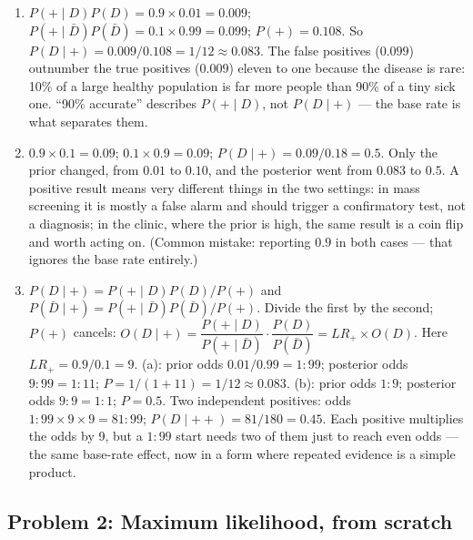 \documentclass[
  11pt,
]{article}
\newcommand{\answerpage}{\clearpage}
\begin{document}
\begin{solutionbox}

\begin{enumerate}
\def\labelenumi{(\alph{enumi})}
\item
  \(P(+\mid D)P(D) = 0.9\times0.01 = 0.009\);
  \(P(+\mid\bar D)P(\bar D) = 0.1\times0.99 = 0.099\); \(P(+) = 0.108\).
  So \(P(D\mid +) = 0.009/0.108 = 1/12 \approx 0.083\). The false
  positives (\(0.099\)) outnumber the true positives (\(0.009\)) eleven
  to one because the disease is rare: 10\% of a large healthy population
  is far more people than 90\% of a tiny sick one. ``90\% accurate''
  describes \(P(+\mid D)\), not \(P(D\mid +)\) --- the base rate is what
  separates them.
\item
  \(0.9\times0.1 = 0.09\); \(0.1\times0.9 = 0.09\);
  \(P(D\mid +) = 0.09/0.18 = 0.5\). Only the prior changed, from
  \(0.01\) to \(0.10\), and the posterior went from \(0.083\) to
  \(0.5\). A positive result means very different things in the two
  settings: in mass screening it is mostly a false alarm and should
  trigger a confirmatory test, not a diagnosis; in the clinic, where the
  prior is high, the same result is a coin flip and worth acting on.
  (Common mistake: reporting \(0.9\) in both cases --- that ignores the
  base rate entirely.)
\item
  \(P(D\mid +) = P(+\mid D)P(D)/P(+)\) and
  \(P(\bar D\mid +) = P(+\mid\bar D)P(\bar D)/P(+)\). Divide the first
  by the second; \(P(+)\) cancels:
  \(O(D\mid +) = \dfrac{P(+\mid D)}{P(+\mid\bar D)}\cdot\dfrac{P(D)}{P(\bar D)} = LR_+\times O(D)\).
  Here \(LR_+ = 0.9/0.1 = 9\). (a): prior odds \(0.01/0.99 = 1{:}99\);
  posterior odds \(9{:}99 = 1{:}11\);
  \(P = 1/(1+11) = 1/12 \approx 0.083\). (b): prior odds \(1{:}9\);
  posterior odds \(9{:}9 = 1{:}1\); \(P = 0.5\). Two independent
  positives: odds \(1{:}99 \times 9\times 9 = 81{:}99\);
  \(P(D\mid ++) = 81/180 = 0.45\). Each positive multiplies the odds by
  9, but a \(1{:}99\) start needs two of them just to reach even odds
  --- the same base-rate effect, now in a form where repeated evidence
  is a simple product.
\end{enumerate}

\end{solutionbox}

\answerpage

\subsection{Problem 2: Maximum likelihood, from
scratch}\label{problem-2-maximum-likelihood-from-scratch}
\end{document}
